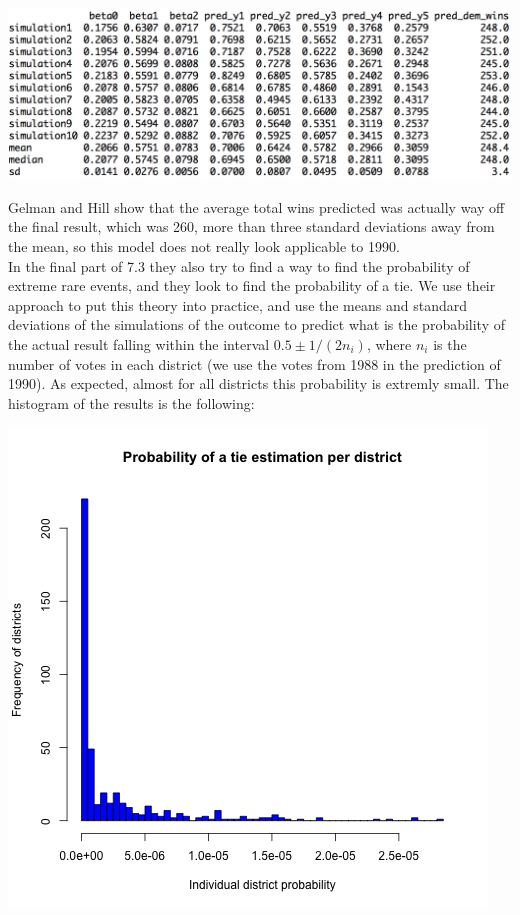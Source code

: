 \documentclass[a4paper, 11pt]{article}
\begin{document}
\begin{center}
\includegraphics[scale=0.7]{plot_ex4_5.png}
\end{center}
Gelman and Hill show that the average total wins predicted was actually way off the final result, which was 260, more than three standard deviations away from the mean, so this model does not really look applicable to 1990.\\
\newline In the final part of 7.3 they also try to find a way to find the probability of extreme rare events, and they look to find the probability of a tie. We use their approach to put this theory into practice, and use the means and standard deviations of the simulations of the outcome to predict what is the probability of the actual result falling within the interval $0.5 \pm 1 / (2 n_i)$, where $n_i$ is the number of votes in each district (we use the votes from 1988 in the prediction of 1990). As expected, almost for all districts this probability is extremly small. The histogram of the results is the following:
\begin{center}
\includegraphics[scale=0.7]{plot_ex4_6.png}
\end{center}
\end{document}
